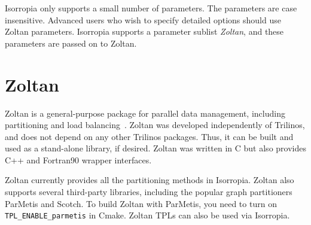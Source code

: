 Isorropia only supports a small number of parameters. The parameters are case insensitive.  Advanced users who wish to specify detailed options should use Zoltan parameters. Isorropia supports a parameter sublist \emph{Zoltan}, and these parameters are passed on to Zoltan.


\section{Zoltan}
\label{sec:zoltan}
Zoltan is a general-purpose package for parallel data management, including partitioning and load balancing~\cite{zoltan2002}. Zoltan was developed independently of Trilinos, and does not depend on any other Trilinos packages. Thus, it can be built and used as a stand-alone library, if desired. Zoltan was written in C but also provides C++ and Fortran90 wrapper interfaces.

Zoltan currently provides all the partitioning methods in Isorropia. Zoltan also supports several third-party libraries, including the popular graph partitioners ParMetis and Scotch. To build Zoltan with ParMetis, you need to turn on \texttt{TPL\_ENABLE\_parmetis} in Cmake. Zoltan TPLs can also be used via Isorropia.

